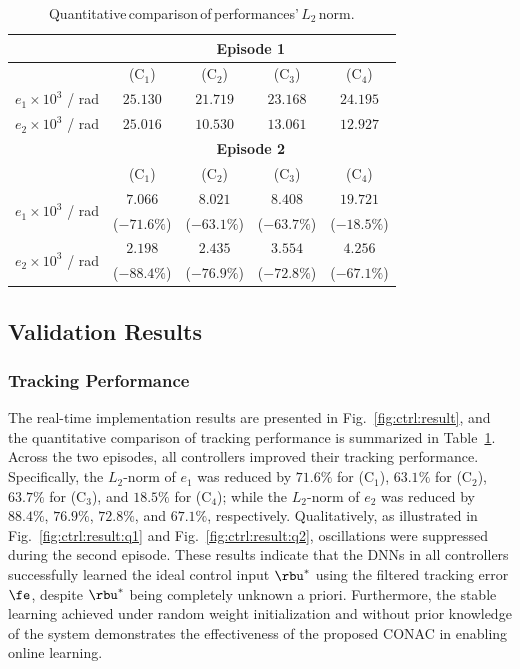 \documentclass[journal]{IEEEtran}
\begin{document}
\begin{table}[!t]
    \renewcommand{\arraystretch}{1.3}
    \caption{Quantitative\,comparison\,of\,performances'\,$L_2$\,norm.}
    \centering
    \begin{tabular}{c c c c c}
    \hline
		& \multicolumn{4}{c}{\textbf{Episode 1}} \\
    \hline
	\hline 
		& (C$_1$) & (C$_2$) & (C$_3$) & (C$_4$) \\
	\hline
		$e_1\times10^{3}$ / rad & $25.130$ & $21.719$ & $23.168$ & $24.195$ \\ 
	\hline
        $e_2\times10^{3}$ / rad & $25.016$ & $10.530$ & $13.061$ & $12.927$ \\
	\hline
        & \multicolumn{4}{c}{\textbf{Episode 2}} \\
    \hline
    \hline
        & (C$_1$) & (C$_2$) & (C$_3$) & (C$_4$) \\
	\hline
    \multirow{2}{*}{$e_1\times10^{3}$ / rad} 
        & $7.066$ & $8.021$ & $8.408$ & $19.721$ \\
        & ($-71.6\%$) & ($-63.1\%$) & ($-63.7\%$) & ($-18.5\%$) \\
    \hline
    \multirow{2}{*}{$e_2\times10^{3}$ / rad} 
        & $2.198$ & $2.435$ & $3.554$ & $4.256$ \\
        & ($-88.4\%$) & ($-76.9\%$) & ($-72.8\%$) & ($-67.1\%$) \\
    \hline
    \end{tabular}
    \label{tab:sim:L2}
\end{table}

\subsection{Validation Results}

\subsubsection{Tracking Performance}

The real-time implementation results are presented in Fig.~\ref{fig:ctrl:result}, and the quantitative comparison of tracking performance is summarized in Table~\ref{tab:sim:L2}.
Across the two episodes, all controllers improved their tracking performance. 
Specifically, the $L_2$-norm of $e_1$ was reduced by $71.6 \%$ for (C$_1$), $63.1 \%$ for (C$_2$), $63.7 \%$ for (C$_3$), and $18.5 \%$ for (C$_4$); while the $L_2$-norm of $e_2$ was reduced by $88.4 \%$, $76.9 \%$, $72.8 \%$, and $67.1 \%$, respectively.
Qualitatively, as illustrated in Fig.~\ref{fig:ctrl:result:q1} and Fig.~\ref{fig:ctrl:result:q2}, oscillations were suppressed during the second episode.
These results indicate that the DNNs in all controllers successfully learned the ideal control input $\rbu^*$ using the filtered tracking error $\fe$, despite $\rbu^*$ being completely unknown a priori.
Furthermore, the stable learning achieved under random weight initialization and without prior knowledge of the system demonstrates the effectiveness of the proposed CONAC in enabling online learning.
\end{document}
